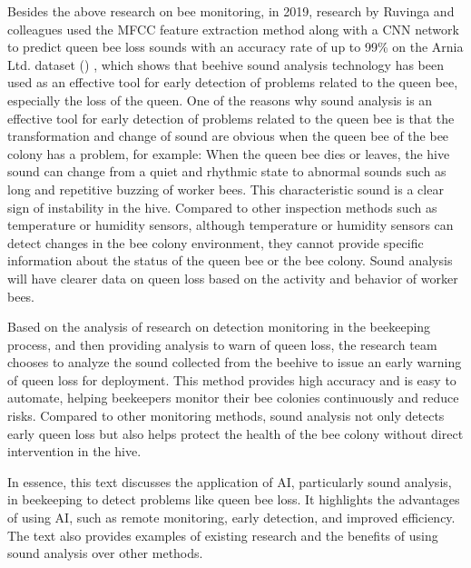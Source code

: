 Besides the above research on bee monitoring, in 2019, research by Ruvinga and colleagues
used the MFCC feature extraction method along with a CNN network to predict queen bee loss
sounds with an accuracy rate of up to 99\% on the Arnia Ltd. dataset
() \cite{ruvinga2023identifying},
which shows that beehive sound analysis technology has been used as an effective tool for
early detection of problems related to the queen bee, especially the loss of the queen. One
of the reasons why sound analysis is an effective tool for early detection of problems
related to the queen bee is that the transformation and change of sound are obvious when
the queen bee of the bee colony has a problem, for example: When the queen bee dies or
leaves, the hive sound can change from a quiet and rhythmic state to abnormal sounds such
as long and repetitive buzzing of worker bees. This characteristic sound is a clear sign of
instability in the hive. Compared to other inspection methods such as temperature or
humidity sensors, although temperature or humidity sensors can detect changes in the bee
colony environment, they cannot provide specific information about the status of the queen
bee or the bee colony. Sound analysis will have clearer data on queen loss based on the
activity and behavior of worker bees.

Based on the analysis of research on detection monitoring in the beekeeping process,
and then providing analysis to warn of queen loss, the research team chooses to
analyze the sound collected from the beehive to issue an early warning of queen loss for
deployment. This method provides high accuracy and is easy to automate, helping beekeepers
monitor their bee colonies continuously and reduce risks. Compared to other monitoring
methods, sound analysis not only detects early queen loss but also helps protect the health
of the bee colony without direct intervention in the hive.

In essence, this text discusses the application of AI, particularly sound analysis, in
beekeeping to detect problems like queen bee loss. It highlights the advantages of using
AI, such as remote monitoring, early detection, and improved efficiency. The text also
provides examples of existing research and the benefits of using sound analysis over other
methods.

